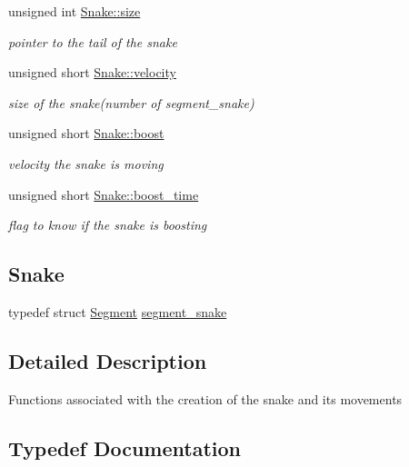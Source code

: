\begin{DoxyCompactItemize}
\item 
unsigned int \hyperlink{group__snake_ga29ba822024f7651a9fa0c80df840252b}{Snake\+::size}
\begin{DoxyCompactList}\small\item\em pointer to the tail of the snake \end{DoxyCompactList}\item 
unsigned short \hyperlink{group__snake_gac444a5a9306233f5be0b603335785b3d}{Snake\+::velocity}
\begin{DoxyCompactList}\small\item\em size of the snake(number of segment\+\_\+snake) \end{DoxyCompactList}\item 
unsigned short \hyperlink{group__snake_ga7339bbc2027ffeb1ce00f24a834610cc}{Snake\+::boost}
\begin{DoxyCompactList}\small\item\em velocity the snake is moving \end{DoxyCompactList}\item 
unsigned short \hyperlink{group__snake_ga0b46bc6b402fd8999c6998eca1806c3e}{Snake\+::boost\+\_\+time}
\begin{DoxyCompactList}\small\item\em flag to know if the snake is boosting \end{DoxyCompactList}\end{DoxyCompactItemize}
\subsection*{Snake}
\begin{DoxyCompactItemize}
\item 
typedef struct \hyperlink{structSegment}{Segment} \hyperlink{group__snake_ga40f634d31a1f9372bd182d65da207a21}{segment\+\_\+snake}
\end{DoxyCompactItemize}


\subsection{Detailed Description}
Functions associated with the creation of the snake and its movements 

\subsection{Typedef Documentation}
